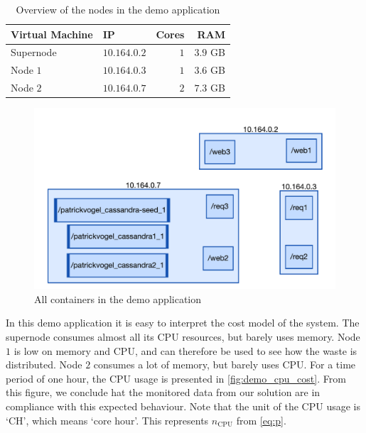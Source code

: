 \begin{table}
    \centering
    \begin{tabular}{l|lrr}
        Virtual Machine &IP & Cores & RAM \\ \hline
        Supernode & $10.164.0.2$ & $1$ & $3.9$ GB \\
        Node $1$ & $10.164.0.3$ & $1$ & $3.6$ GB \\
        Node $2$ & $10.164.0.7$ & $2$ & $7.3$ GB \\
    \end{tabular}
    \caption{Overview of the nodes in the demo application}
    \label{tab:node_stats}
\end{table}

\begin{figure}
    \centering
    \includegraphics[width=\textwidth]{gfx/demo_app}
    \caption{All containers in the demo application}
    \label{fig:demo_app}
\end{figure}

\noindent
In this demo application it is easy to interpret the cost model of the system. The supernode consumes almost all its CPU resources, but barely uses memory. Node $1$ is low on memory and CPU, and can therefore be used to see how the waste is distributed. Node $2$ consumes a lot of memory, but barely uses CPU. For a time period of one hour, the CPU usage is presented in \autoref{fig:demo_cpu_cost}. From this figure, we conclude hat the monitored data from our solution are in compliance with this expected behaviour. Note that the unit of the CPU usage is `CH', which means `core hour'. This represents $n_\text{CPU}$ from \autoref{eq:p}.\\

